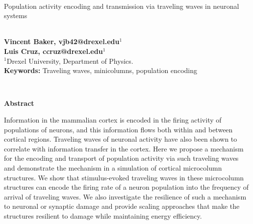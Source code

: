 \documentclass[12pt]{article}
\begin{document}
\hspace{13.9cm}

\ \vspace{20mm}\\

{\LARGE Population activity encoding and transmission via traveling waves in neuronal systems}

\ \\
{\bf \large Vincent Baker, vjb42@drexel.edu$^{\displaystyle 1}$}\\
{\bf \large Luis Cruz, ccruz@drexel.edu$^{\displaystyle 1}$}\\
{$^{\displaystyle 1}$Drexel University, Department of Physics.}\\
%

{\bf Keywords:} Traveling waves,  minicolumns, population encoding

\thispagestyle{empty}
%
\ \vspace{-0mm}\\
%
\begin{center} {\bf Abstract} \end{center}
Information in the mammalian cortex is encoded in the firing activity of populations of neurons, and this information flows both within and between cortical regions.
Traveling waves of neuronal activity have also been shown to correlate with information transfer in the cortex.
Here we propose a mechanism for the encoding and transport of population activity via such traveling waves and demonstrate the mechanism in a simulation of cortical microcolumn structures.
We show that stimulus-evoked traveling waves in these microcolumn structures can encode the firing rate of a neuron population into the frequency of arrival of traveling waves.
We also investigate the resilience of such a mechanism to neuronal or synaptic damage and provide scaling approaches that make the structures resilient to damage while maintaining energy efficiency.

\end{document}
